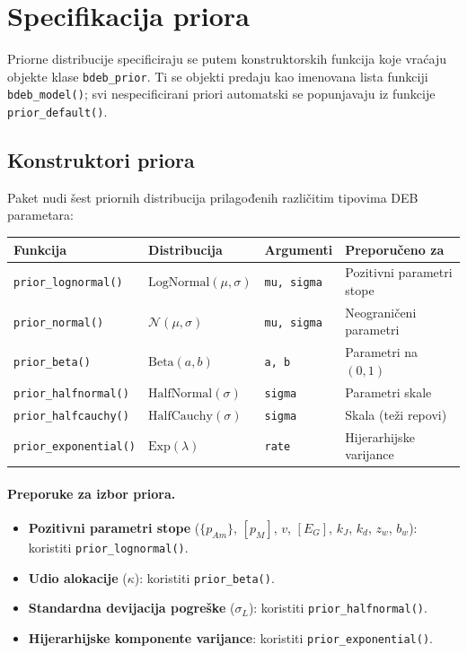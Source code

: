 \documentclass[11pt,a4paper]{article}
\newcommand{\fn}[1]{\texttt{#1()}}
\newcommand{\code}[1]{\texttt{#1}}
\begin{document}
\section{Specifikacija priora}
\label{sec:priori}

Priorne distribucije specificiraju se putem konstruktorskih funkcija koje
vraćaju objekte klase \code{bdeb\_prior}.  Ti se objekti predaju kao
imenovana lista funkciji \fn{bdeb\_model}; svi nespecificirani priori
automatski se popunjavaju iz funkcije \fn{prior\_default}.

\subsection{Konstruktori priora}

Paket nudi šest priornih distribucija prilagođenih različitim tipovima
DEB parametara:

\begin{longtable}{llll}
\toprule
\textbf{Funkcija} & \textbf{Distribucija} & \textbf{Argumenti} & \textbf{Preporučeno za} \\
\midrule
\endhead
\fn{prior\_lognormal} & $\text{LogNormal}(\mu, \sigma)$ & \code{mu, sigma} & Pozitivni parametri stope \\
\fn{prior\_normal} & $\mathcal{N}(\mu, \sigma)$ & \code{mu, sigma} & Neograničeni parametri \\
\fn{prior\_beta} & $\text{Beta}(a, b)$ & \code{a, b} & Parametri na $(0,1)$ \\
\fn{prior\_halfnormal} & $\text{HalfNormal}(\sigma)$ & \code{sigma} & Parametri skale \\
\fn{prior\_halfcauchy} & $\text{HalfCauchy}(\sigma)$ & \code{sigma} & Skala (teži repovi) \\
\fn{prior\_exponential} & $\text{Exp}(\lambda)$ & \code{rate} & Hijerarhijske varijance \\
\bottomrule
\end{longtable}

\paragraph{Preporuke za izbor priora.}
\begin{itemize}[nosep]
  \item \textbf{Pozitivni parametri stope} ($\{p_{Am}\}$, $[p_M]$, $v$,
    $[E_G]$, $k_J$, $k_d$, $z_w$, $b_w$): koristiti \fn{prior\_lognormal}.
  \item \textbf{Udio alokacije} ($\kappa$): koristiti \fn{prior\_beta}.
  \item \textbf{Standardna devijacija pogreške} ($\sigma_L$): koristiti
    \fn{prior\_halfnormal}.
  \item \textbf{Hijerarhijske komponente varijance}: koristiti
    \fn{prior\_exponential}.
\end{itemize}
\end{document}
